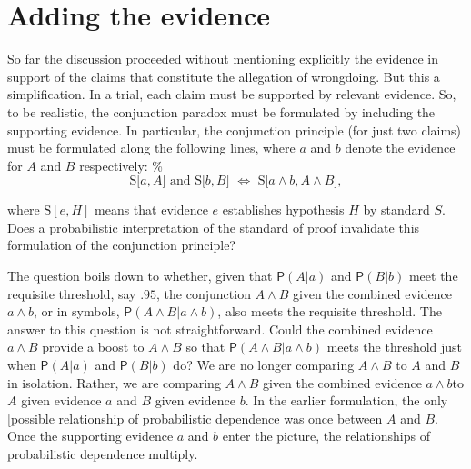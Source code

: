 \documentclass[
  10pt,
  dvipsnames,enabledeprecatedfontcommands]{scrartcl}
\newcommand{\pr}[1]{\mathsf{P}(#1)}
\begin{document}
\hypertarget{adding-the-evidence}{%
\section{Adding the evidence}\label{adding-the-evidence}}

So far the discussion proceeded without mentioning explicitly the
evidence in support of the claims that constitute the allegation of
wrongdoing. But this a simplification. In a trial, each claim must be
supported by relevant evidence. So, to be realistic, the conjunction
paradox must be formulated by including the supporting evidence. In
particular, the conjunction principle (for just two claims) must be
formulated along the following lines, where \(a\) and \(b\) denote the
evidence for \(A\) and \(B\) respectively: \%
\[\text{S[$a, A$] and S[$b, B$] $\Leftrightarrow$ S[$a \wedge b, A\wedge B$]},\]

\noindent where \(\text{S}[e, H]\) means that evidence \(e\) establishes
hypothesis \(H\) by standard \(S\). Does a probabilistic interpretation
of the standard of proof invalidate this formulation of the conjunction
principle?

The question boils down to whether, given that \(\pr{A \vert a}\) and
\(\pr{B \vert b}\) meet the requisite threshold, say \(.95\), the
conjunction \(A \wedge B\) given the combined evidence \(a\wedge b\), or
in symbols, \(\pr{A\wedge B \vert a\wedge b}\), also meets the requisite
threshold. The answer to this question is not straightforward. Could the
combined evidence \(a\wedge B\) provide a boost to \(A\wedge B\) so that
\(\pr{A\wedge B \vert a\wedge b}\) meets the threshold just when
\(\pr{A \vert a}\) and \(\pr{B \vert b}\) do? We are no longer comparing
\(A\wedge B\) to \(A\) and \(B\) in isolation. Rather, we are comparing
\(A \wedge B\) given the combined evidence \(a \wedge b\)to \(A\) given
evidence \(a\) and \(B\) given evidence \(b\). In the earlier
formulation, the only {[}possible relationship of probabilistic
dependence was once between \(A\) and \(B\). Once the supporting
evidence \(a\) and \(b\) enter the picture, the relationships of
probabilistic dependence multiply.
\end{document}

